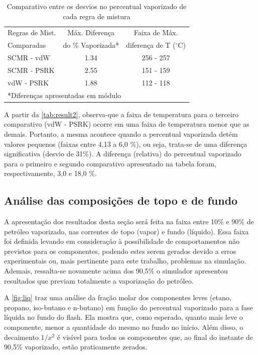 \clearpage
\begin{table}[htb]
\renewcommand{\arraystretch}{1.3}
\caption{Comparativo entre os desvios no percentual vaporizado de cada regra de
mistura}
\footnotesize
\center 
\begin{tabular}{lcc}   
\toprule
  {Regras de Mist.} &{Máx. Diferença}&{Faixa de Máx.} \\
   {Comparadas}&{do \% Vaporizada*}&{diferença de T ($^\circ$C)} \\
\midrule 
{SCMR - vdW}	&	1.34	&	{256 - 257}	 \\
{SCMR - PSRK}	&	2.55	&	{151 - 159}	 \\
{vdW - PSRK}	&	1.88	&	{112 - 118}	 \\
\bottomrule
\multicolumn{3}{l}{*Diferenças apresentadas em módulo}
\end{tabular}
\label{tab:result2}
\end{table}

A partir da \autoref{tab:result2}, observa-que a faixa de temperatura para o
terceiro comparativo (vdW - PSRK) ocorre em uma faixa de temperatura menor que
as demais. Portanto, a mesma acontece quando a percentual vaporizada detém
valores pequenos (faixas entre 4,13 a 6,0 {\%}), ou seja, trata-se de uma
diferença significativa (desvio de 31{\%}). A diferença (relativa) do percentual
vaporizado para o primeiro e segundo comparativo apresentado na tabela foram,
respectivamente, 3,0 e 18,0 {\%}.

\clearpage

\subsection{Análise das composições de topo e de fundo}

A apresentação dos resultados desta seção será feita na faixa entre
10{\%} e 90{\%} de petróleo vaporizado, nas correntes de topo (vapor) e fundo
(líquido). Essa faixa foi definida levando em
consideração à possibilidade de comportamentos não previstos para os componentes, 
podendo estes serem gerados devido a erros experimentais ou, mais pertinente 
para este trabalho, problemas na simulação. Ademais, ressalta-se novamente 
acima dos 90,5{\%} o simulador apresentou resultados que previam totalmente
a vaporização do petróleo.

A \autoref{fig:liq} traz uma análise da fração molar dos componentes leves 
(etano, propano, iso-butano e n-butano) em função do percentual vaporizado 
para a fase líquida no fundo do flash. Ela mostra que, como esperado, quanto
 mais leve o componente, menor a quantidade do mesmo no fundo no início. Além 
 disso, o decaimento $1/x^2$ é visível para todos os componentes que, ao final
 do instante de 90,5{\%} vaporizado, estão praticamente zerados.

